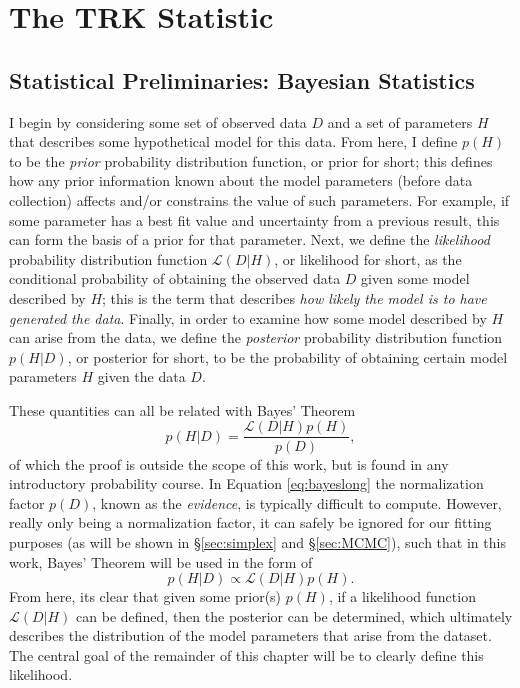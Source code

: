 \chapter{The TRK Statistic}
\label{cha:TRK}

\section{Statistical Preliminaries: Bayesian Statistics}
\label{sec:bayes}
I begin by considering some set of observed data $D$ and a set of parameters $H$ that describes some hypothetical model for this data. From here, I define $p(H)$ to be the \textit{prior} probability distribution function, or prior for short; this defines how any prior information known about the model parameters (before data collection) affects and/or constrains the value of such parameters. For example, if some parameter has a best fit value and uncertainty from a previous result, this can form the basis of a prior for that parameter. Next, we define the \textit{likelihood} probability distribution function $\mathcal{L}(D|H)$, or likelihood for short, as the conditional probability of obtaining the observed data $D$ given some model described by $H$; this is the term that describes \textit{how likely the model is to have generated the data}. Finally, in order to examine how some model described by $H$ can arise from the data, we define the \textit{posterior} probability distribution function $p(H|D)$, or posterior for short, to be the probability of obtaining certain model parameters $H$ given the data $D$.

These quantities can all be related with Bayes' Theorem
\begin{equation}\label{eq:bayeslong}
     p(H|D)=\frac{\mathcal{L}(D|H)p(H)}{p(D)},
\end{equation}
of which the proof is outside the scope of this work, but is found in any introductory probability course. In Equation \eqref{eq:bayeslong} the normalization factor $p(D)$, known as the \textit{evidence}, is typically difficult to compute. However, really only being a normalization factor, it can safely be ignored for our fitting purposes (as will be shown in \S\ref{sec:simplex} and \S\ref{sec:MCMC}), such that in this work, Bayes' Theorem will be used in the form of 
\begin{equation}\label{eq:bayes}
     p(H|D)\propto\mathcal{L}(D|H)p(H).
\end{equation}
From here, its clear that given some prior(s) $p(H)$, if a likelihood function $\mathcal{L}(D|H)$ can be defined, then the posterior can be determined, which ultimately describes the distribution of the model parameters that arise from the dataset. The central goal of the remainder of this chapter will be to clearly define this likelihood.

